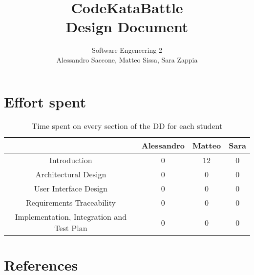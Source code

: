 \documentclass[12pt,a4paper]{article}
\title{CodeKataBattle\\ Design Document}
\author{Software Engeneering 2\\
       Alessandro Saccone, Matteo Sissa, Sara Zappia}
\begin{document}
\maketitle

\newpage
\tableofcontents











\section{Effort spent}
\begin{table}[h]
  \centering
  \begin{tabular}{|c|c|c|c|}
    \hline
      & Alessandro & Matteo & Sara \\
    \hline
    Introduction & 0 & 12 & 0 \\
    \hline
    Architectural Design & 0 & 0 & 0 \\
    \hline
    User Interface Design & 0 & 0 & 0 \\ 
    \hline
    Requirements Traceability & 0 & 0 & 0  \\
    \hline
    Implementation, Integration and Test Plan & 0 & 0 & 0 \\
    \hline
    
  \end{tabular}
  \caption{Time spent on every section of the DD for each student}
  \label{tab:effort}
\end{table}

\section{References}
%
%
\end{document}
